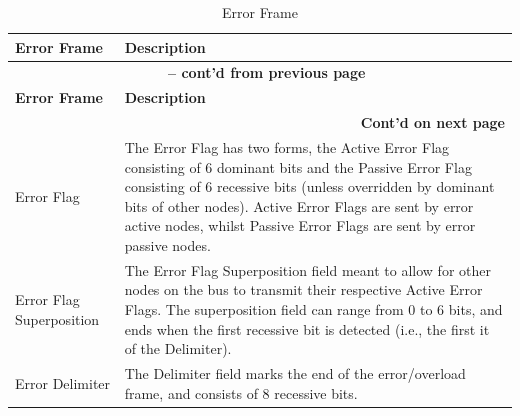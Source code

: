 \begin{longtable}[c]{|p{4cm}|p{11cm}|} 
    
  \caption{Error Frame}
  \label{tab:twai-error-frame} 
  \\\hline
  \rowcolor{lightgray}
  \textbf{Error Frame} & \textbf{Description}
  \\\hline
  \endfirsthead
  
  \multicolumn{2}{c}{\bfseries \tablename\ \thetable{} -- cont'd from previous page}\\  \hline
  
  \rowcolor{lightgray}
    \textbf{Error Frame} & \textbf{Description}
  \\\hline
  \endhead
  
  \multicolumn{2}{r}{\textbf{Cont'd on next page}} \\
  \endfoot
  \endlastfoot

    Error Flag & The Error Flag has two forms, the Active Error Flag consisting of 6 dominant bits and the Passive Error Flag consisting of 6 recessive bits (unless overridden by dominant bits of other nodes). Active Error Flags are sent by error active nodes, whilst Passive Error Flags are sent by error passive nodes.
          \\\hline
    Error Flag Superposition & The Error Flag Superposition field meant to allow for other nodes on the bus to transmit their respective Active Error Flags. The superposition field can range from 0 to 6 bits, and ends when the first recessive bit is detected (i.e., the first it of the Delimiter).           \\\hline
    Error Delimiter & The Delimiter field marks the end of the error/overload frame, and consists of 8 recessive bits.                                                  
          \\\hline
\end{longtable}
